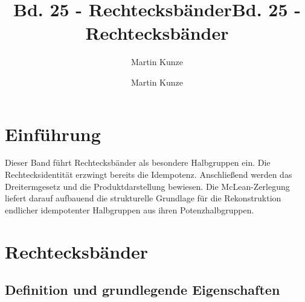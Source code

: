 \documentclass[main.tex]{subfiles}
\title{Bd. 25 - Rechtecksbänder}
\author{Martin Kunze}
\date{}
\begin{document}
\title{Bd. 25 - Rechtecksbänder}
\author{Martin Kunze}
\date{}
\hypersetup{pageanchor=false}
\maketitle
\hypersetup{pageanchor=true}
\setcounter{tocdepth}{3}
\tableofcontents
\setcounter{file}{25}
\renewcommand{\FormulaBandID}{25}

\chapter{Einführung}

Dieser Band führt Rechtecksbänder als besondere Halbgruppen ein. Die
Rechtecksidentität erzwingt bereits die Idempotenz. Anschließend werden das
Dreitermgesetz und die Produktdarstellung bewiesen. Die McLean-Zerlegung
liefert darauf aufbauend die strukturelle Grundlage für die Rekonstruktion
endlicher idempotenter Halbgruppen aus ihren Potenzhalbgruppen.

\chapter{Rechtecksbänder}

\section{Definition und grundlegende Eigenschaften}


\end{document}
